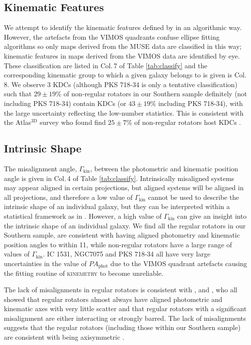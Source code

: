 \documentclass[a4paper,fleqn,usenatbib]{mnras}
\begin{document}
	\subsection{Kinematic Features}
		We attempt to identify the kinematic features defined by \citet{Krajnovic2011} in an algorithmic way. However, the artefacts from the VIMOS quadrants confuse ellipse fitting algorithms so only maps derived from the MUSE data are classified in this way; kinematic features in maps derived from the VIMOS data are identified by eye. These classification are listed in Col.\,7 of Table \ref{tab:classify} and the corresponding kinematic group to which a given galaxy belongs to is given is Col.\,8. We observe 3 KDCs (although PKS 718-34 is only a tentative classification) such that $29\pm19$\% of non-regular rotators in our Southern sample definitely (not including PKS 718-34) contain KDCs (or $43\pm19$\% including PKS 718-34), with the large uncertainty reflecting the low-number statistics. This is consistent with the Atlas$^\text{3D}$ survey who found find $25\pm7$\% of non-regular rotators host KDCs \citep{Krajnovic2011}.


	\subsection{Intrinsic Shape}
		The misalignment angle, $\Gamma_\text{kin}$, between the photometric and kinematic position angle is given in Col.\,4 of Table \ref{tab:classify}. Intrinsically misaligned systems may appear aligned in certain projections, but aligned systems will be aligned in all projections, and therefore a low value of $\Gamma_\text{kin}$ cannot be used to describe the intrinsic shape of an individual galaxy, but they can be interpreted within a statistical framework as in \citet{Cappellari2007}. However, a high value of $\Gamma_\text{kin}$ can give an insight into the intrinsic shape of an individual galaxy. We find all the regular rotators in our Southern sample, are consistent with having aligned photometry and kinematic position angles to within 11\degr, while non-regular rotators have a large range of values of $\Gamma_\text{kin}$. IC 1531, NGC7075 and PKS 718-34 all have very large uncertainties in the value of $PA_\text{phot}$ due to the VIMOS quadrant artefacts causing the fitting routine of \textsc{kinemetry} to become unreliable. 

		The lack of misalignments in regular rotators is consistent with \citet{Cappellari2007}, \citet{Krajnovic2011} and \citet{Fogarty2015}, who all showed that regular rotators almost always have aligned photometric and kinematic axes with very little scatter and that regular rotators with a significant misalignment are either interacting or strongly barred. The lack of misalignments suggests that the regular rotators (including those within our Southern sample) are consistent with being axisymmetric \citep{Cappellari2016}.
\end{document}
